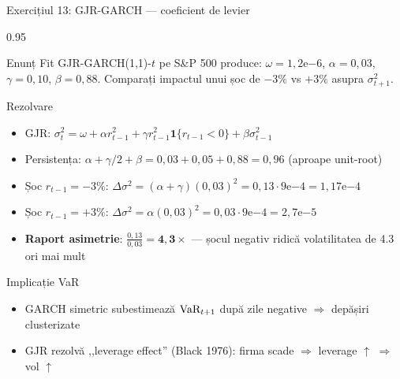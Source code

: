 \documentclass[9pt, aspectratio=169, t]{beamer}
\begin{document}
\begin{frame}[shrink=10]{Exercițiul 13: GJR-GARCH --- coeficient de levier}
    \begin{cminipage}{0.95\textwidth}
    \begin{block}{Enunț}
    Fit GJR-GARCH(1,1)-$t$ pe S\&P 500 produce: $\omega = 1{,}2\mathrm{e}{-6}$, $\alpha = 0{,}03$, $\gamma = 0{,}10$, $\beta = 0{,}88$. Comparați impactul unui șoc de $-3\%$ vs $+3\%$ asupra $\sigma^2_{t+1}$.
    \end{block}
    \begin{exampleblock}{Rezolvare}
    \begin{itemize}\setlength{\itemsep}{0pt}
        \item GJR: $\sigma^2_t = \omega + \alpha r^2_{t-1} + \gamma r^2_{t-1}\mathbf{1}\{r_{t-1}<0\} + \beta\sigma^2_{t-1}$
        \item Persistența: $\alpha + \gamma/2 + \beta = 0{,}03 + 0{,}05 + 0{,}88 = 0{,}96$ (aproape unit-root)
        \item Șoc $r_{t-1} = -3\%$: $\Delta \sigma^2 = (\alpha + \gamma)(0{,}03)^2 = 0{,}13 \cdot 9\mathrm{e}{-4} = 1{,}17\mathrm{e}{-4}$
        \item Șoc $r_{t-1} = +3\%$: $\Delta\sigma^2 = \alpha (0{,}03)^2 = 0{,}03 \cdot 9\mathrm{e}{-4} = 2{,}7\mathrm{e}{-5}$
        \item \textbf{Raport asimetrie}: $\frac{0{,}13}{0{,}03} = \mathbf{4{,}3\times}$ --- șocul negativ ridică volatilitatea de 4.3 ori mai mult
    \end{itemize}
    \end{exampleblock}
    \begin{alertblock}{Implicație VaR}
    \begin{itemize}\setlength{\itemsep}{0pt}
        \item GARCH simetric subestimează $\text{VaR}_{t+1}$ după zile negative $\Rightarrow$ depășiri clusterizate
        \item GJR rezolvă ,,leverage effect'' (Black 1976): firma scade $\Rightarrow$ leverage $\uparrow$ $\Rightarrow$ vol $\uparrow$
    \end{itemize}
    \end{alertblock}
    \end{cminipage}
\end{frame}
\end{document}
